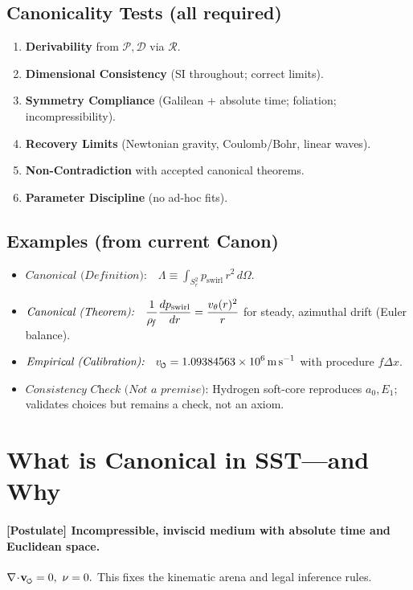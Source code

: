 \documentclass[11pt]{article}
\begin{document}
    \subsection*{Canonicality Tests (all required)}
    \begin{enumerate}
        \item \textbf{Derivability} from \(\mathcal{P},\mathcal{D}\) via \(\mathcal{R}\).
        \item \textbf{Dimensional Consistency} (SI throughout; correct limits).
        \item \textbf{Symmetry Compliance} (Galilean + absolute time; foliation; incompressibility).
        \item \textbf{Recovery Limits} (Newtonian gravity, Coulomb/Bohr, linear waves).
        \item \textbf{Non-Contradiction} with accepted canonical theorems.
        \item \textbf{Parameter Discipline} (no ad-hoc fits).
    \end{enumerate}

    \subsection*{Examples (from current Canon)}
    \begin{itemize}
        \item \(\displaystyle \textit{Canonical (Definition):}\quad \Lambda \equiv \int_{S_r^2} p_{\text{swirl}}\,r^2\,d\Omega.\)
        \item \(\displaystyle \textit{Canonical (Theorem):}\quad \frac{1}{\rho_{\!f}}\frac{dp_{\text{swirl}}}{dr}=\frac{v_\theta(r)^2}{r}\) for steady, azimuthal drift (Euler balance).
        \item \(\displaystyle \textit{Empirical (Calibration):}\quad \vscore=1.09384563\times10^{6}\,\mathrm{m\,s^{-1}}\) with procedure \(f\Delta x\).
        \item \(\displaystyle \textit{Consistency Check (Not a premise):}\) Hydrogen soft-core reproduces \(a_0,E_1\); validates choices but remains a check, not an axiom.
    \end{itemize}

    \section{What is Canonical in SST—and Why}

    \paragraph{[Postulate] Incompressible, inviscid medium with absolute time and Euclidean space.}
    \(\nabla\!\cdot\!\vswirl=0,\ \nu=0.\)
    This fixes the kinematic arena and legal inference rules.
\end{document}
